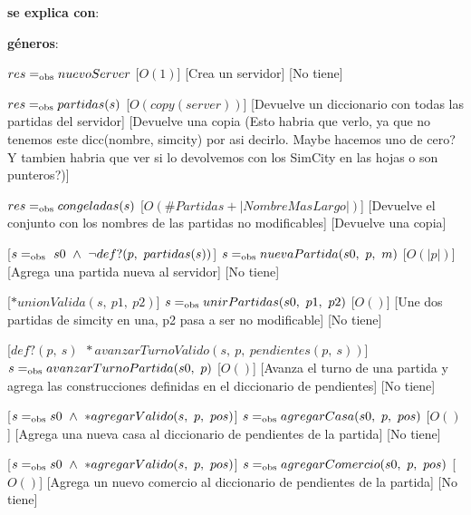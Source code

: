 \begin{Interfaz}
    \textbf{se explica con}: 

    \textbf{géneros}: 


    {$res =_{\mathrm{obs}} nuevoServer$}
    [$O(1)$]
    [Crea un servidor]
    [No tiene]

    {$res =_{\mathrm{obs}} partidas(s)$}
    [$O(copy(server))$]
    [Devuelve un diccionario con todas las partidas del servidor]
    [Devuelve una copia (Esto habria que verlo, ya que no tenemos este dicc(nombre, simcity) por asi decirlo.
    Maybe hacemos uno de cero? Y tambien habria que ver si lo devolvemos con los SimCity en las hojas o son punteros?)]

    {$res =_{\mathrm{obs}} congeladas(s)$}
    [$O(\# Partidas + |NombreMasLargo|)$]
    [Devuelve el conjunto con los nombres de las partidas no modificables]
    [Devuelve una copia]

    [$s \igobs\ s0\ \wedge\ \lnot def?(p,\ partidas(s))$]
    {$s =_{\mathrm{obs}} nuevaPartida(s0,\ p,\ m)$}
    [$O(|p|)$]
    [Agrega una partida nueva al servidor]
    [No tiene]

    [$*unionValida(s,\ p1,\ p2)$]
    {$s \igobs unirPartidas(s0,\ p1,\ p2)$}
    [$O()$]
    [Une dos partidas de simcity en una, p2 pasa a ser no modificable]
    [No tiene]

    [$def?(p,\ s)\ $\yluego$\ *avanzarTurnoValido(s,\ p,\ pendientes(p,\ s))$]
    {$s \igobs avanzarTurnoPartida(s0,\ p)$}
    [$O()$]
    [Avanza el turno de una partida y agrega las construcciones definidas en el diccionario de pendientes]
    [No tiene]

    [$s \igobs s0\ \wedge\ *agregarValido(s,\ p,\ pos)$]
    {$s =_{\mathrm{obs}} agregarCasa(s0,\ p,\ pos)$}
    [$O()$]
    [Agrega una nueva casa al diccionario de pendientes de la partida]
    [No tiene]

    \pagebreak
    
    [$s \igobs s0\ \wedge\ *agregarValido(s,\ p,\ pos)$]
    {$s =_{\mathrm{obs}} agregarComercio(s0,\ p,\ pos)$}
    [$O()$]
    [Agrega un nuevo comercio al diccionario de pendientes de la partida]
    [No tiene]
    

\end{Interfaz}
